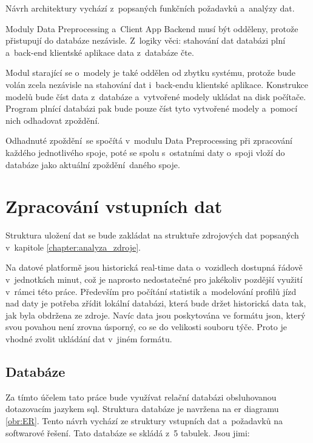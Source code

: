 \bigbreak


Návrh architektury vychází z~popsaných funkčních požadavků a~analýzy dat.


\bigbreak


Moduly Data Preprocessing a~Client App Backend musí být odděleny, protože přistupují do databáze nezávisle. Z~logiky věci: stahování dat databázi plní a~back-end klientské aplikace data z~databáze čte.


\bigbreak


Modul starající se o~modely je také oddělen od zbytku systému, protože bude volán zcela nezávisle na stahování dat i~back-endu klientské aplikace. Konstrukce modelů bude číst data z~databáze a~vytvořené modely ukládat na disk počítače. Program plnící databázi pak bude pouze číst tyto vytvořené modely a~pomocí nich odhadovat zpoždění.

\bigbreak

Odhadnuté zpoždění se spočítá v~modulu Data Preprocessing při zpracování každého jednotlivého spoje, poté se spolu s~ostatními daty o~spoji vloží do databáze jako aktuální zpoždění daného spoje.


\section{Zpracování vstupních dat} \label{section:zpracovani_vstupnich_dat}


Struktura uložení dat se bude zakládat na struktuře zdrojových dat popsaných v~kapitole \ref{chapter:analyza_zdroje}.


\bigbreak


Na datové platformě jsou historická real-time data o~vozidlech dostupná řádově v~jednotkách minut, což je naprosto nedostatečné pro jakékoliv pozdější využití v~rámci této práce. Především pro počítání statistik a~modelování profilů jízd nad daty je potřeba zřídit lokální databázi, která bude držet historická data tak, jak byla obdržena ze zdroje. Navíc data jsou poskytována ve formátu \gls{json}, který svou povahou není zrovna úsporný, co se do velikosti souboru týče. Proto je vhodné zvolit ukládání dat v~jiném formátu.


\subsection{Databáze} \label{subsection:databaze}

Za tímto účelem tato práce bude využívat relační databázi obsluhovanou dotazovacím jazykem \gls{sql}. Struktura databáze je navržena na \gls{er} diagramu \ref{obr:ER}. Tento návrh vychází ze struktury vstupních dat a~požadavků na softwarové řešení. Tato databáze se skládá z~5 tabulek. Jsou jimi:


